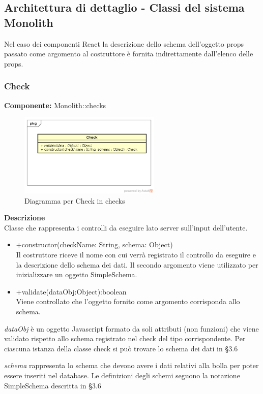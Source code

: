 \clearpage

\subsection{Architettura di dettaglio - Classi del sistema Monolith}
Nel caso dei componenti React la descrizione dello schema dell'oggetto props passato come argomento al costruttore è fornita indirettamente dall'elenco delle props.
\subsubsection{Check}
\textbf{Componente:}  Monolith::checks\\
   \FloatBarrier
   \begin{figure}[ht]
   \centering
   \includegraphics[width=0.6\textwidth]{img/single-Check.png}
   \caption{{Diagramma per Check in checks}}
\end{figure}
\FloatBarrier
\textbf{Descrizione}\\
Classe che rappresenta i controlli da eseguire lato server sull'input dell'utente. 
\begin{itemize}
\item +constructor(checkName: String, schema: Object) \\
Il costruttore riceve il nome con cui verrà registrato il controllo da eseguire e la descrizione dello schema dei dati. Il secondo argomento viene utilizzato per inizializzare un oggetto SimpleSchema.
\item +validate(dataObj:Object):boolean \\
Viene controllato che l'oggetto fornito come argomento corrisponda allo schema.
\end{itemize}
\emph{dataObj} è un oggetto Javascript formato da soli attributi (non funzioni) che viene validato rispetto allo schema registrato nel check del tipo corrispondente. Per ciascuna istanza della classe check si può trovare lo schema dei dati in \S 3.6

\emph{schema} rappresenta lo schema che devono avere i dati relativi alla bolla per poter essere inseriti nel database. Le definizioni degli schemi seguono la notazione SimpleSchema descritta in \S 3.6 


